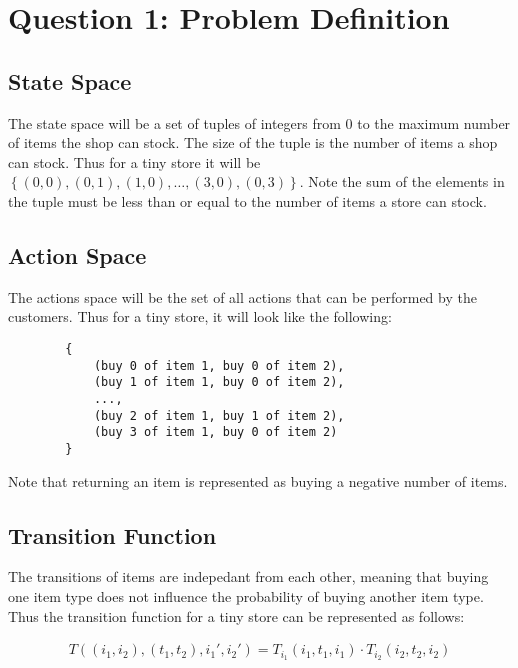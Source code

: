 \documentclass[12pt]{article}
\begin{document}
    \maketitle

    \section{Question 1: Problem Definition}

    \subsection{State Space}
    The state space will be a set of tuples of integers from 0 to the maximum number of items the shop can stock. The size of the tuple is the number of items a shop can stock. 
    Thus for a tiny store it will be $\left\{(0, 0), (0, 1), (1, 0), \ldots, (3, 0), (0, 3)\right\}$. Note the sum of the elements in the tuple must be less than or equal to the number of items a store can stock.

    \subsection{Action Space}
    The actions space will be the set of all actions that can be performed by the customers. 
    Thus for a tiny store, it will look like the following:

    \begin{verbatim}
        {
            (buy 0 of item 1, buy 0 of item 2),
            (buy 1 of item 1, buy 0 of item 2),
            ...,
            (buy 2 of item 1, buy 1 of item 2),
            (buy 3 of item 1, buy 0 of item 2)
        }
    \end{verbatim}

    Note that returning an item is represented as buying a negative number of items.

    \subsection{Transition Function}

    The transitions of items are indepedant from each other, meaning that buying one item type does not influence the probability of buying another item type. Thus the transition function for a tiny store can be represented as follows:

    \begin{align*}
        T((i_1, i_2), (t_1, t_2), i_1', i_2') = T_{i_1}(i_1, t_1, i_1) \cdot T_{i_2}(i_2, t_2, i_2)
    \end{align*}
\end{document}
